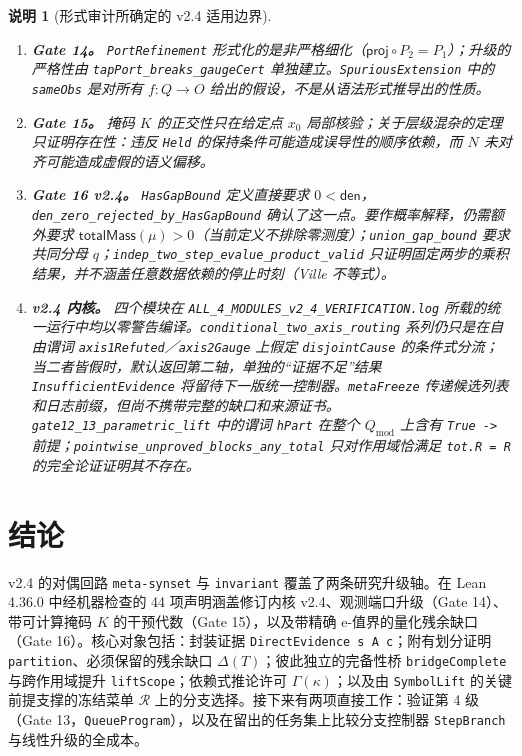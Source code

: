 \documentclass[11pt,a4paper,UTF8,fontset=fandol]{ctexart}
\newtheorem{remark}[theorem]{说明}
\DeclareRobustCommand{\id}[1]{\nolinkurl{#1}}
\begin{document}
\begin{remark}[形式审计所确定的 v2.4 适用边界]
\begin{enumerate}
\item \textbf{Gate 14。} \id{PortRefinement} 形式化的是非严格细化（$\mathsf{proj}\circ P_2=P_1$）；升级的严格性由 \id{tapPort_breaks_gaugeCert} 单独建立。\id{SpuriousExtension} 中的 \id{sameObs} 是对所有 $f:Q\to O$ 给出的假设，不是从语法形式推导出的性质。
\item \textbf{Gate 15。} 掩码 $K$ 的正交性只在给定点 $x_0$ 局部核验；关于层级混杂的定理只证明存在性：违反 \id{Held} 的保持条件可能造成误导性的顺序依赖，而 $N$ 未对齐可能造成虚假的语义偏移。
\item \textbf{Gate 16 v2.4。} \id{HasGapBound} 定义直接要求 $0<\mathsf{den}$，\id{den_zero_rejected_by_HasGapBound} 确认了这一点。要作概率解释，仍需额外要求 $\mathsf{totalMass}(\mu)>0$（当前定义不排除零测度）；\id{union_gap_bound} 要求共同分母 $q$；\id{indep_two_step_evalue_product_valid} 只证明固定两步的乘积结果，并不涵盖任意数据依赖的停止时刻（Ville 不等式）。
\item \textbf{v2.4 内核。} 四个模块在 \id{ALL_4_MODULES_v2_4_VERIFICATION.log} 所载的统一运行中均以零警告编译。\id{conditional_two_axis_routing} 系列仍只是在自由谓词 \id{axis1Refuted}／\id{axis2Gauge} 上假定 \id{disjointCause} 的条件式分流；当二者皆假时，默认返回第二轴，单独的“证据不足”结果 \id{InsufficientEvidence} 将留待下一版统一控制器。\id{metaFreeze} 传递候选列表和日志前缀，但尚不携带完整的缺口和来源证书。\id{gate12_13_parametric_lift} 中的谓词 \id{hPart} 在整个 $Q_{\mathrm{mod}}$ 上含有 \id{True ->} 前提；\id{pointwise_unproved_blocks_any_total} 只对作用域恰满足 \id{tot.R = R} 的完全论证证明其不存在。
\end{enumerate}
\end{remark}

\section{结论}
v2.4 的对偶回路 \id{meta-synset} 与 \id{invariant} 覆盖了两条研究升级轴。在 Lean 4.36.0 中经机器检查的 44 项声明涵盖修订内核 v2.4、观测端口升级（Gate 14）、带可计算掩码 $K$ 的干预代数（Gate 15），以及带精确 e-值界的量化残余缺口（Gate 16）。核心对象包括：封装证据 \id{DirectEvidence s A c}；附有划分证明 \id{partition}、必须保留的残余缺口 $\Delta(T)$；彼此独立的完备性桥 \id{bridgeComplete} 与跨作用域提升 \id{liftScope}；依赖式推论许可 $\Gamma(\kappa)$；以及由 \id{SymbolLift} 的关键前提支撑的冻结菜单 $\mathcal R$ 上的分支选择。接下来有两项直接工作：验证第 4 级（Gate 13，\id{QueueProgram}），以及在留出的任务集上比较分支控制器 \id{StepBranch} 与线性升级的全成本。
\end{document}
